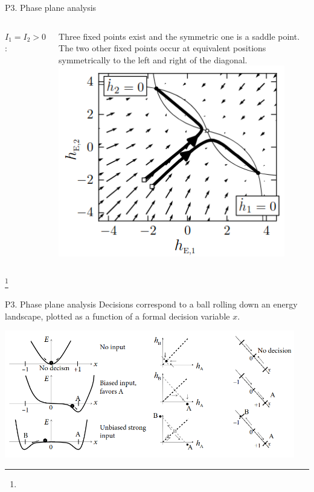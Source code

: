\documentclass[xcolor=table,dvipsnames,svgnames,aspectratio=169,fontset=fandol]{ctexbeamer}
\begin{document}
\begin{frame}{P3. Phase plane analysis}
  \begin{columns}
    \textbf{$I_1=I_2>0$}:

    \vskip 12pt
    Three fixed points exist and the symmetric one is a saddle point. The two other fixed points occur at equivalent positions symmetrically to the left and right of the diagonal.
    \includegraphics[width=0.9\textwidth,height=0.8\textheight]{phase3.png}
  \end{columns}\footnote{}   
\end{frame}

\begin{frame}{P3. Phase plane analysis}
  Decisions correspond to a ball rolling down an energy landscape, plotted as a function of a formal decision variable $x$.

  \begin{center}
  \includegraphics[width=0.95\textwidth,height=0.75\textheight]{competition4.png}
  \end{center}
\end{frame}
\end{document}
